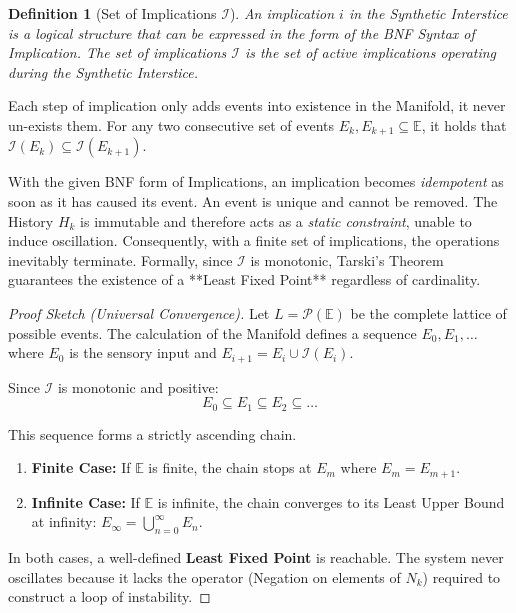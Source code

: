 \documentclass[11pt, a4paper]{article}
\theoremstyle{formalism}
\newtheorem{formalism}{Definition}
\begin{document}
\begin{formalism}[Set of Implications $\mathcal{I}$]
    An implication $i$ in the Synthetic Interstice is a logical structure that can 
    be expressed in the form of the BNF Syntax of Implication. The set of 
    implications $\mathcal{I}$ is the set of active implications operating during 
    the Synthetic Interstice.
\end{formalism}

Each step of implication only adds events into existence in the Manifold, it
never un-exists them. For any two consecutive set of events $E_k, E_{k+1}
\subseteq \mathbb{E}$, it holds that $\mathcal{I}(E_k) \subseteq \mathcal{I}(E_{k+1})$.

With the given BNF form of Implications, an implication becomes {\it
idempotent\/} as soon as it has caused its event. An event is unique and cannot
be removed. The History $H_k$ is immutable and therefore acts as a {\it static
constraint}, unable to induce oscillation. Consequently, with a finite set of
implications, the operations inevitably terminate. Formally, since
$\mathcal{I}$ is monotonic, Tarski's Theorem~\cite{Tarski1955} guarantees the
existence of a **Least Fixed Point** regardless of cardinality.

\begin{proof}[Proof Sketch (Universal Convergence)]

    Let $L = \mathcal{P}(\mathbb{E})$ be the complete lattice of possible events.
    The calculation of the Manifold defines a sequence $E_0, E_1, \dots$ where
    $E_0$ is the sensory input and $E_{i+1} = E_i \cup \mathcal{I}(E_i)$.

    Since $\mathcal{I}$ is monotonic and positive:
    \begin{equation}
        E_0 \subseteq E_1 \subseteq E_2 \subseteq \dots
    \end{equation}

    This sequence forms a strictly ascending chain.
    
    \begin{enumerate}
        \item \textbf{Finite Case:} If $\mathbb{E}$ is finite, the chain stops at 
            $E_m$ where $E_m = E_{m+1}$.

        \item \textbf{Infinite Case:} If $\mathbb{E}$ is infinite, the chain converges 
            to its Least Upper Bound at infinity: $E_{\infty} = \bigcup_{n=0}^{\infty} E_n$.
    \end{enumerate}

    In both cases, a well-defined \textbf{Least Fixed Point} is reachable. The system never 
    oscillates because it lacks the operator (Negation on elements of $N_k$) required to 
    construct a loop of instability.

\end{proof}
\end{document}
